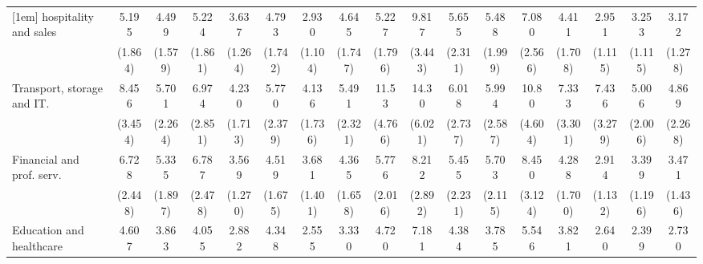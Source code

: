 {\begin{tabular}{l*{16}{c}}
[1em]
hospitality and sales&       5.195\sym{***}&       4.499\sym{***}&       5.224\sym{***}&       3.637\sym{***}&       4.793\sym{***}&       2.930\sym{**} &       4.645\sym{***}&       5.227\sym{***}&       9.817\sym{***}&       5.655\sym{***}&       5.488\sym{***}&       7.080\sym{***}&       4.411\sym{***}&       2.951\sym{**} &       3.253\sym{***}&       3.172\sym{**} \\
                    &     (1.864)         &     (1.579)         &     (1.861)         &     (1.264)         &     (1.742)         &     (1.104)         &     (1.747)         &     (1.796)         &     (3.443)         &     (2.311)         &     (1.999)         &     (2.566)         &     (1.708)         &     (1.115)         &     (1.115)         &     (1.278)         \\
[1em]
Transport, storage and IT.&       8.456\sym{***}&       5.701\sym{***}&       6.974\sym{***}&       4.230\sym{***}&       5.770\sym{***}&       4.136\sym{***}&       5.491\sym{***}&       11.53\sym{***}&       14.30\sym{***}&       6.018\sym{***}&       5.994\sym{***}&       10.80\sym{***}&       7.333\sym{***}&       7.436\sym{***}&       5.006\sym{***}&       4.869\sym{***}\\
                    &     (3.454)         &     (2.264)         &     (2.851)         &     (1.713)         &     (2.379)         &     (1.736)         &     (2.321)         &     (4.766)         &     (6.021)         &     (2.737)         &     (2.587)         &     (4.604)         &     (3.301)         &     (3.279)         &     (2.006)         &     (2.268)         \\
[1em]
Financial and prof. serv.&       6.728\sym{***}&       5.335\sym{***}&       6.787\sym{***}&       3.569\sym{***}&       4.519\sym{***}&       3.681\sym{***}&       4.365\sym{***}&       5.776\sym{***}&       8.212\sym{***}&       5.455\sym{***}&       5.703\sym{***}&       8.450\sym{***}&       4.288\sym{***}&       2.914\sym{**} &       3.399\sym{***}&       3.471\sym{**} \\
                    &     (2.448)         &     (1.897)         &     (2.478)         &     (1.270)         &     (1.675)         &     (1.401)         &     (1.658)         &     (2.016)         &     (2.892)         &     (2.231)         &     (2.115)         &     (3.124)         &     (1.700)         &     (1.132)         &     (1.196)         &     (1.436)         \\
[1em]
Education and healthcare&       4.607\sym{***}&       3.863\sym{***}&       4.055\sym{***}&       2.882\sym{**} &       4.348\sym{***}&       2.555\sym{*}  &       3.330\sym{**} &       4.720\sym{***}&       7.181\sym{***}&       4.384\sym{***}&       3.785\sym{***}&       5.546\sym{***}&       3.821\sym{***}&       2.640\sym{*}  &       2.399\sym{*}  &       2.730\sym{*}  \\

\end{tabular}}
